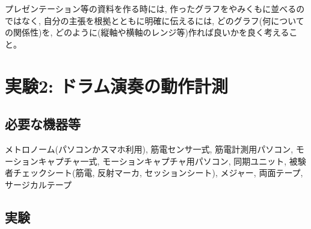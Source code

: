 \documentclass{ltjsarticle}
\begin{document}
プレゼンテーション等の資料を作る時には, 作ったグラフをやみくもに並べるのではなく, 自分の主張を根拠とともに明確に伝えるには, どのグラフ(何についての関係性)を, どのように(縦軸や横軸のレンジ等)作れば良いかを良く考えること。


\section{実験2: ドラム演奏の動作計測}

\subsection{必要な機器等}

メトロノーム(パソコンかスマホ利用), 筋電センサ一式, 筋電計測用パソコン, モーションキャプチャ一式, モーションキャプチャ用パソコン, 同期ユニット, 被験者チェックシート(筋電, 反射マーカ, セッションシート), メジャー, 両面テープ, サージカルテープ

\subsection{実験}
\end{document}
